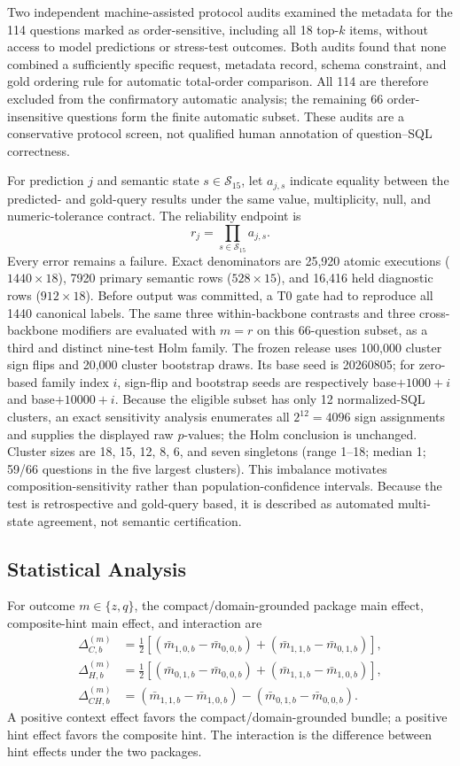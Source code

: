 \documentclass[applsci,article,submit,moreauthors]{Definitions/mdpi}
\begin{document}
Two independent machine-assisted protocol audits examined the metadata for the 114 questions marked as order-sensitive, including all 18 top-$k$ items, without access to model predictions or stress-test outcomes. Both audits found that none combined a sufficiently specific request, metadata record, schema constraint, and gold ordering rule for automatic total-order comparison. All 114 are therefore excluded from the confirmatory automatic analysis; the remaining 66 order-insensitive questions form the finite automatic subset. These audits are a conservative protocol screen, not qualified human annotation of question--SQL correctness.

For prediction $j$ and semantic state $s\in\mathcal{S}_{15}$, let $a_{j,s}$ indicate equality between the predicted- and gold-query results under the same value, multiplicity, null, and numeric-tolerance contract. The reliability endpoint is
\begin{equation}
r_j=\prod_{s\in\mathcal{S}_{15}} a_{j,s}.
\end{equation}
Every error remains a failure. Exact denominators are 25,920 atomic executions ($1440\times18$), 7920 primary semantic rows ($528\times15$), and 16,416 held diagnostic rows ($912\times18$). Before output was committed, a T0 gate had to reproduce all 1440 canonical labels. The same three within-backbone contrasts and three cross-backbone modifiers are evaluated with $m=r$ on this 66-question subset, as a third and distinct nine-test Holm family. The frozen release uses 100,000 cluster sign flips and 20,000 cluster bootstrap draws. Its base seed is 20260805; for zero-based family index $i$, sign-flip and bootstrap seeds are respectively base$+1000+i$ and base$+10000+i$. Because the eligible subset has only 12 normalized-SQL clusters, an exact sensitivity analysis enumerates all $2^{12}=4096$ sign assignments and supplies the displayed raw $p$-values; the Holm conclusion is unchanged. Cluster sizes are 18, 15, 12, 8, 6, and seven singletons (range 1--18; median 1; 59/66 questions in the five largest clusters). This imbalance motivates composition-sensitivity rather than population-confidence intervals. Because the test is retrospective and gold-query based, it is described as automated multi-state agreement, not semantic certification.

\subsection{Statistical Analysis}
For outcome $m\in\{z,q\}$, the compact/domain-grounded package main effect, composite-hint main effect, and interaction are
\begin{align}
\Delta_{C,b}^{(m)}&=\tfrac12[(\bar m_{1,0,b}-\bar m_{0,0,b})+
(\bar m_{1,1,b}-\bar m_{0,1,b})],\\
\Delta_{H,b}^{(m)}&=\tfrac12[(\bar m_{0,1,b}-\bar m_{0,0,b})+
(\bar m_{1,1,b}-\bar m_{1,0,b})],\\
\Delta_{CH,b}^{(m)}&=(\bar m_{1,1,b}-\bar m_{1,0,b})-
(\bar m_{0,1,b}-\bar m_{0,0,b}).
\end{align}
A positive context effect favors the compact/domain-grounded bundle; a positive hint effect favors the composite hint. The interaction is the difference between hint effects under the two packages.
\end{document}
